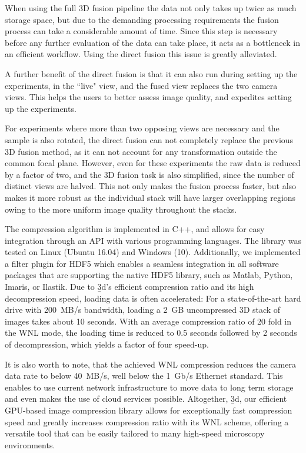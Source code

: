 When using the full 3D fusion pipeline the data not only takes up twice as much storage space, but due to the demanding processing requirements the fusion process can take a considerable amount of time. Since this step is necessary before any further evaluation of the data can take place, it acts as a bottleneck in an efficient workflow. Using the direct fusion this issue is greatly alleviated.

A further benefit of the direct fusion is that it can also run during setting up the experiments, in the ``live" view, and the fused view replaces the two camera views. This helps the users to better assess image quality, and expedites setting up the experiments.

For experiments where more than two opposing views are necessary and the sample is also rotated, the direct fusion can not completely replace the previous 3D fusion method, as it can not account for any transformation outside the common focal plane. However, even for these experiments the raw data is reduced by a factor of two, and the 3D fusion task is also simplified, since the number of distinct views are halved. This not only makes the fusion process faster, but also makes it more robust as the individual stack will have larger overlapping regions owing to the more uniform image quality throughout the stacks.



The compression algorithm is implemented in C++, and allows for easy integration through an API with various programming languages. The library was tested on Linux (Ubuntu 16.04) and Windows (10). Additionally, we implemented a filter plugin for HDF5 which enables a seamless integration in all software packages that are supporting the native HDF5 library, such as Matlab, Python, Imaris, or Ilastik. Due to \b3d’s efficient compression ratio and its high decompression speed, loading data is often accelerated: For a state-of-the-art hard drive with \SI{200}{MB/s} bandwidth, loading a \SI{2}{GB} uncompressed 3D stack of images takes about 10 seconds. With an average compression ratio of 20 fold in the WNL mode, the loading time is reduced to 0.5 seconds followed by 2 seconds of decompression, which yields a factor of four speed-up.

It is also worth to note, that the achieved WNL compression reduces the camera data rate to below \SI{40}{MB/s}, well below the \SI{1}{Gb/s} Ethernet standard. This enables to use current network infrastructure to move data to long term storage and even makes the use of cloud services possible. Altogether, \b3d, our efficient GPU-based image compression library allows for exceptionally fast compression speed and greatly increases compression ratio with its WNL scheme, offering a versatile tool that can be easily tailored to many high-speed microscopy environments.